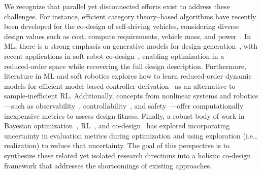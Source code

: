 We recognize that parallel yet disconnected efforts exist to address these challenges. For instance, efficient category theory–based algorithms have recently been developed for the co‑design of self‑driving vehicles, considering diverse design values such as cost, compute requirements, vehicle mass, and power~\citep{zardini2021co,zardini2022task,milojevic2025codei}. In \gls{ML}, there is a strong emphasis on generative models for design generation~\citep{vahdat2022lion}, with recent applications in soft robot co‑design~\citep{song2024morphvae, wang2024diffusebot}, enabling optimization in a reduced‑order space while recovering the full design description. Furthermore, literature in ML and soft robotics explores how to learn reduced‑order dynamic models for efficient model‑based controller derivation~\citep{hewing2020learning, alora2023data, della2023model, stolzle2024input, alkayas2025soft} as an alternative to sample‑inefficient \gls{RL}. Additionally, concepts from nonlinear systems and robotics—such as observability~\citep{griffith1971observability}, controllability~\citep{zheng2019controllability}, and safety~\citep{haddadin2013towards, iso2016collaborative}—offer computationally inexpensive metrics to assess design fitness. Finally, a robust body of work in Bayesian optimization~\citep{hernandez2014predictive, garnett2023bayesian}, \gls{RL}~\citep{sutton1998reinforcement}, and co‑design~\citep{huang2025composable, furter2025composable} has explored incorporating uncertainty in evaluation metrics during optimization and using exploration (i.e., realization) to reduce that uncertainty. The goal of this perspective is to synthesize these related yet isolated research directions into a holistic co‑design framework that addresses the shortcomings of existing approaches.

